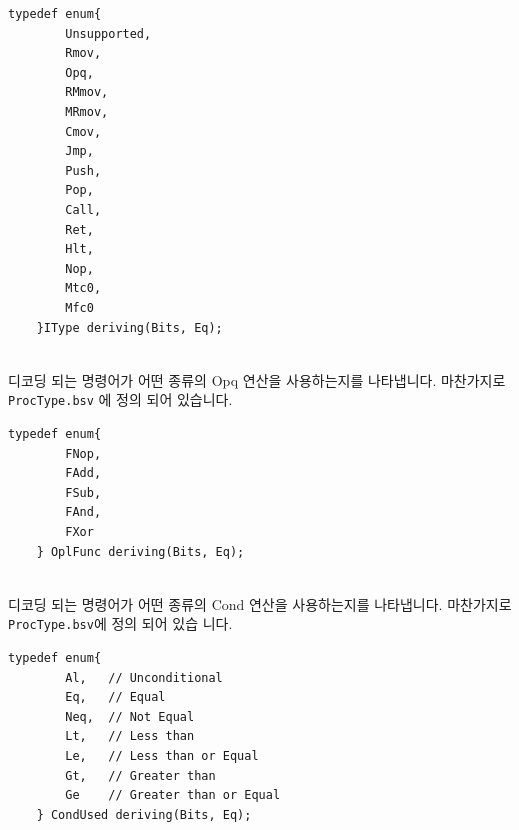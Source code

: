 \documentclass{article}
\begin{document}
\begin{Verbatim}[frame=single]
	typedef enum{
		Unsupported,
		Rmov,
		Opq,
		RMmov,
		MRmov,
		Cmov,
		Jmp,
		Push,
		Pop,
		Call,
		Ret,
		Hlt,
		Nop,
		Mtc0,
		Mfc0 
	}IType deriving(Bits, Eq);
\end{Verbatim}

\\
디코딩 되는 명령어가 어떤 종류의 Opq 연산을 사용하는지를 나타냅니다. 마찬가지로 \texttt{ProcType.bsv}
에 정의 되어 있습니다.

\begin{Verbatim}[frame=single]
	typedef enum{
		FNop,
		FAdd,
		FSub,
		FAnd,
		FXor
	} OplFunc deriving(Bits, Eq);
\end{Verbatim}

\\
디코딩 되는 명령어가 어떤 종류의 Cond 연산을 사용하는지를 나타냅니다. 마찬가지로 \texttt{ProcType.bsv}에 정의 되어 있습
니다.

\begin{Verbatim}[frame=single]
	typedef enum{
		Al,   // Unconditional
		Eq,   // Equal
		Neq,  // Not Equal
		Lt,   // Less than
		Le,   // Less than or Equal
		Gt,   // Greater than
		Ge    // Greater than or Equal
	} CondUsed deriving(Bits, Eq);
\end{Verbatim}
\end{document}
